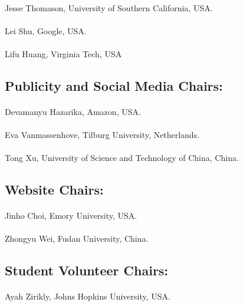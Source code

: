 \paragraph{} Jesse Thomason, University of Southern California, USA. 
\paragraph{} Lei Shu, Google, USA. 
\paragraph{} Lifu Huang, Virginia Tech, USA

\subsection*{Publicity and Social Media Chairs:} 
\paragraph{} Devamanyu Hazarika, Amazon, USA. 
\paragraph{} Eva Vanmassenhove, Tilburg University, Netherlands. 
\paragraph{} Tong Xu, University of Science and Technology of China, China. 

\subsection*{Website Chairs:}
\paragraph{} Jinho Choi, Emory University, USA. 
\paragraph{} Zhongyu Wei, Fudan University, China.  

\subsection*{Student Volunteer Chairs:}
\paragraph{} Ayah Zirikly, Johns Hopkins University, USA.
